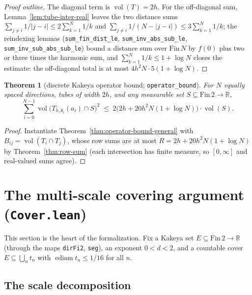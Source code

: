 \documentclass[11pt,a4paper]{article}
\newcommand{\R}{\mathbb{R}}
\newcommand{\ennr}{\ensuremath{[0,\infty]}}          %
\newcommand{\vol}{\operatorname{vol}}                %
\DeclareMathOperator{\ediam}{ediam}
\newcommand{\FinTwo}{\ensuremath{\mathrm{Fin}\,2 \to \R}}
\newcommand{\tube}{T}                                %
\newcommand{\lname}[1]{\texttt{#1}}                  %
\newtheorem{theorem}{Theorem}[section]
\theoremstyle{definition}
\theoremstyle{remark}
\begin{document}
\begin{proof}[Proof outline]
The diagonal term is $\vol(\tube)=2h$.  For the off-diagonal sum,
Lemma~\ref{lem:tube-inter-real} leaves the two distance sums
$\sum_{j\ne i} 1/|j-i|\le 2\sum_{k=1}^N 1/k$ and
$\sum_{j\ne i} 1/(N-|j-i|)\le 3\sum_{k=1}^N 1/k$; the reindexing lemmas
(\lname{sum\_fin\_dist\_le}, \lname{sum\_inv\_abs\_sub\_le},
\lname{sum\_inv\_sub\_abs\_sub\_le}) bound a distance sum over $\mathrm{Fin}\,N$ by $f(0)$
plus two or three times the harmonic sum, and
$\sum_{k=1}^N 1/k\le 1+\log N$ closes the estimate:
the off-diagonal total is at most $4h^2N\cdot 5(1+\log N)$.
\end{proof}

\begin{theorem}[{discrete Kakeya operator bound; \lname{operator\_bound}}]
\label{thm:operator-bound}
For $N$ equally spaced directions, tubes of width $2h$, and any measurable set
$S\subseteq\FinTwo$,
\[
  \sum_{i=0}^{N-1} \vol\bigl(\tube_{h,\theta_i}(a_i)\cap S\bigr)^{2}
  \;\le\; 2\bigl(2h+20h^2N(1+\log N)\bigr)\cdot \vol(S).
\]
\end{theorem}

\begin{proof}
Instantiate Theorem~\ref{thm:operator-bound-general} with
$B_{ij}=\vol(T_i\cap T_j)$, whose row sums are at most
$R=2h+20h^2N(1+\log N)$ by Theorem~\ref{thm:row-sum} (each intersection has finite
measure, so $\ennr$ and real-valued sums agree).
\end{proof}

\section{The multi-scale covering argument (\lname{Cover.lean})}
\label{sec:cover}

This section is the heart of the formalization.  Fix a Kakeya set $E\subseteq\FinTwo$
(through the maps \lname{dirFi2}, \lname{seg}), an exponent $0<d<2$, and a countable
cover $E\subseteq\bigcup_n t_n$ with $\ediam t_n\le 1/16$ for all $n$.

\subsection{The scale decomposition}
\end{document}
